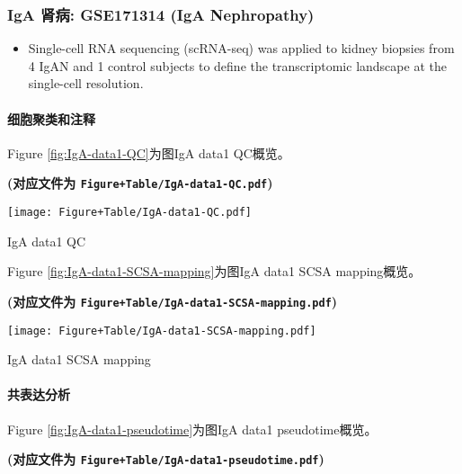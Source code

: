 \documentclass[
]{article}
\providecommand{\tightlist}{%
  \setlength{\itemsep}{0pt}\setlength{\parskip}{0pt}}
\begin{document}
\hypertarget{iga-ux80beux75c5-gse171314-iga-nephropathy}{%
\subsubsection{IgA 肾病: GSE171314 (IgA Nephropathy)}\label{iga-ux80beux75c5-gse171314-iga-nephropathy}}

\begin{itemize}
\tightlist
\item
  Single-cell RNA sequencing (scRNA-seq) was applied to kidney biopsies from 4
  IgAN and 1 control subjects to define the transcriptomic landscape at the
  single-cell resolution.
\end{itemize}

\hypertarget{ux7ec6ux80deux805aux7c7bux548cux6ce8ux91ca-2}{%
\paragraph{细胞聚类和注释}\label{ux7ec6ux80deux805aux7c7bux548cux6ce8ux91ca-2}}

Figure \ref{fig:IgA-data1-QC}为图IgA data1 QC概览。

\textbf{(对应文件为 \texttt{Figure+Table/IgA-data1-QC.pdf})}

\def\@captype{figure}
\begin{center}
\texttt{[image: Figure+Table/IgA-data1-QC.pdf]}
\caption{IgA data1 QC}\label{fig:IgA-data1-QC}
\end{center}

Figure \ref{fig:IgA-data1-SCSA-mapping}为图IgA data1 SCSA mapping概览。

\textbf{(对应文件为 \texttt{Figure+Table/IgA-data1-SCSA-mapping.pdf})}

\def\@captype{figure}
\begin{center}
\texttt{[image: Figure+Table/IgA-data1-SCSA-mapping.pdf]}
\caption{IgA data1 SCSA mapping}\label{fig:IgA-data1-SCSA-mapping}
\end{center}

\hypertarget{ux5171ux8868ux8fbeux5206ux6790-1}{%
\paragraph{共表达分析}\label{ux5171ux8868ux8fbeux5206ux6790-1}}

Figure \ref{fig:IgA-data1-pseudotime}为图IgA data1 pseudotime概览。

\textbf{(对应文件为 \texttt{Figure+Table/IgA-data1-pseudotime.pdf})}
\end{document}
